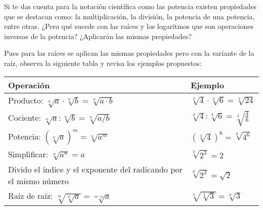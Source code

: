 \documentclass[12pt,a4paper]{article}
\begin{document}
\begin{tcolorbox}[colback=fondorosa,colframe=rojoclaro,title=\textbf{Mini Explicación: Propiedades de las raíces y los logaritmos},fonttitle=\bfseries,breakable]

Si te das cuenta para la notación científica como las potencia existen propiedades que se destacan como: la multiplicación, la división, la potencia de una potencia, entre otras. ¿Pero qué sucede con las raíces y los logaritmos que son operaciones inversas de la potencia? ¿Aplicarán las mismas propiedades?

Pues para las raíces se aplican las mismas propiedades pero con la variante de la raíz, observa la siguiente tabla y revisa los ejemplos propuestos:

\vspace{0.5cm}

\begin{center}
\small
\begin{tabular}{|p{}|p{}|}
\hline
\cellcolor{fondoverde}\textbf{Operación} & \textbf{Ejemplo} \\
\hline
Producto: $\sqrt[n]{a} \cdot \sqrt[n]{b} = \sqrt[n]{a \cdot b}$ & $\sqrt[3]{4} \cdot \sqrt[3]{6} = \sqrt[3]{24}$ \\
\hline
Cociente: $\sqrt[n]{a} : \sqrt[n]{b} = \sqrt[n]{a/b}$ & $\sqrt[3]{4} : \sqrt[3]{6} = \sqrt[3]{\frac{4}{6}}$ \\
\hline
Potencia: $(\sqrt[n]{a})^m = \sqrt[n]{a^m}$ & $(\sqrt[3]{4})^6 = \sqrt[3]{4^6}$ \\
\hline
Simplificar: $\sqrt[n]{a^n} = a$ & $\sqrt[3]{2^3} = 2$ \\
\hline
Divido el índice y el exponente del radicando por el mismo número & $\sqrt[6]{2^3} = \sqrt{2}$ \\
\hline
Raíz de raíz: $\sqrt[m]{\sqrt[n]{a}} = \sqrt[m \cdot n]{a}$ & $\sqrt[4]{\sqrt[2]{3}} = \sqrt[8]{3}$ \\
\hline
\end{tabular}
\normalsize
\end{center}

\end{tcolorbox}


\vspace{0.5cm}
\end{document}
